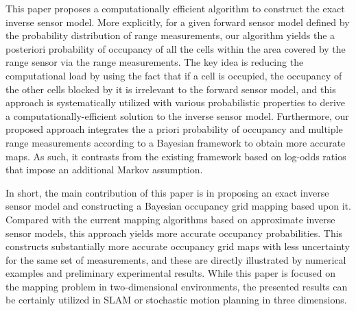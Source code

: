 \documentclass[letterpaper, 10pt, conference]{ieeeconf}
\begin{document}
This paper proposes a computationally efficient algorithm to construct the exact inverse sensor model. More explicitly, for a given forward sensor model defined by the probability distribution of range measurements, our algorithm yields the a posteriori probability of occupancy of all the cells within the area covered by the range sensor via the range measurements. The key idea is reducing the computational load by using the fact that if a cell is occupied, the occupancy of the other cells blocked by it is irrelevant to the forward sensor model, and this approach is systematically utilized with various probabilistic properties to derive a computationally-efficient solution to the inverse sensor model. Furthermore, our proposed approach integrates the a priori probability of occupancy and multiple range measurements according to a Bayesian framework to obtain more accurate maps. As such, it contrasts from the existing framework based on log-odds ratios that impose an additional Markov assumption. 


In short, the main contribution of this paper is in proposing an exact inverse sensor model and constructing a Bayesian occupancy grid mapping based upon  it. Compared with the current mapping algorithms based on   approximate inverse sensor models, this approach yields more accurate occupancy probabilities. This constructs substantially more accurate occupancy grid maps with less uncertainty for the same set of measurements, and these are directly illustrated by numerical examples and preliminary experimental results. While this paper is focused on the mapping problem in two-dimensional environments, the presented results can be certainly utilized in SLAM or stochastic motion planning in three dimensions.



\end{document}
